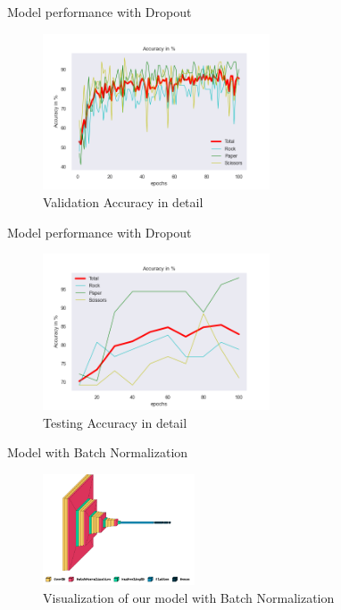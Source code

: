 \documentclass[aspectratio=169]{beamer}
\begin{document}
{    \begin{frame}{Model performance with Dropout}
        \begin{figure}
            \centering
            \includegraphics[width=0.6\textwidth]{img/baptiste_100epoches_accuracy__Dropouts_True__BatchNorm_False.png}
            \caption{Validation Accuracy in detail}
        \end{figure}
    \end{frame}

    \begin{frame}{Model performance with Dropout}
        \begin{figure}
            \centering
            \includegraphics[width=0.6\textwidth]{img/baptiste_100_epoches_test_accuracy__Dropouts_True__BatchNorm_False.png}
            \caption{Testing Accuracy in detail}
        \end{figure}
    \end{frame}


    \begin{frame}{Model with Batch Normalization}
        \begin{figure}
            \centering
            \includegraphics[width=0.4\textwidth]{img/model_dropout_false_batchnorm_true.png}
            \caption{Visualization of our model with Batch Normalization}
        \end{figure}
    \end{frame}

}
\end{document}
